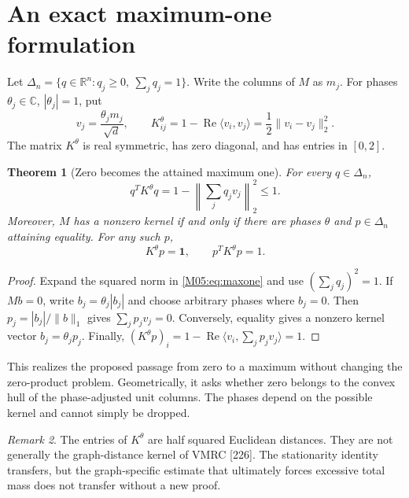 \documentclass[11pt,a4paper,oneside]{report}
\newtheorem{theorem}{Theorem}[section]
\theoremstyle{definition}
\theoremstyle{remark}
\newtheorem{remark}[theorem]{Remark}
\newcommand{\C}{\mathbb C}
\newcommand{\R}{\mathbb R}
\newcommand{\one}{\mathbf 1}
\newcommand{\DD}{\Delta}
\begin{document}
\section{An exact maximum-one formulation}
\label{M05:sec:simplex}

Let $\DD_n=\{q\in\R^n:q_j\ge0,\ \sum_jq_j=1\}$.
Write the columns of $M$ as $m_j$. For phases
$\theta_j\in\C$, $|\theta_j|=1$, put
\begin{equation}\label{M05:eq:phasekernel}
 v_j=\frac{\theta_jm_j}{\sqrt d},\qquad
 K^\theta_{ij}=1-\operatorname{Re}\langle v_i,v_j\rangle
             =\frac12\|v_i-v_j\|_2^2 .
\end{equation}
The matrix $K^\theta$ is real symmetric, has zero diagonal, and has
entries in $[0,2]$.

\begin{theorem}[Zero becomes the attained maximum one]\label{M05:thm:shift}
For every $q\in\DD_n$,
\begin{equation}\label{M05:eq:maxone}
 q^TK^\theta q=1-\left\|\sum_jq_jv_j\right\|_2^2\le1.
\end{equation}
Moreover, $M$ has a nonzero kernel if and only if there are phases
$\theta$ and $p\in\DD_n$ attaining equality. For any such $p$,
\begin{equation}\label{M05:eq:stationarity}
 K^\theta p=\one,\qquad p^TK^\theta p=1 .
\end{equation}
\end{theorem}
\begin{proof}
Expand the squared norm in \eqref{M05:eq:maxone} and use
$(\sum_jq_j)^2=1$. If $Mb=0$, write
$b_j=\theta_j|b_j|$ and choose arbitrary phases where $b_j=0$.
Then $p_j=|b_j|/\|b\|_1$ gives $\sum_jp_jv_j=0$.
Conversely, equality gives a nonzero kernel vector
$b_j=\theta_jp_j$. Finally,
$(K^\theta p)_i=1-\operatorname{Re}\langle v_i,\sum_jp_jv_j\rangle=1$.
\end{proof}

This realizes the proposed passage from zero to a maximum without
changing the zero-product problem. Geometrically, it asks whether
zero belongs to the convex hull of the phase-adjusted unit columns.
The phases depend on the possible kernel and cannot simply be
dropped.

\begin{remark}
The entries of $K^\theta$ are half squared Euclidean distances.
They are not generally the graph-distance kernel of VMRC [226].
The stationarity identity transfers, but the graph-specific estimate
that ultimately forces excessive total mass does not transfer
without a new proof.
\end{remark}
\end{document}
